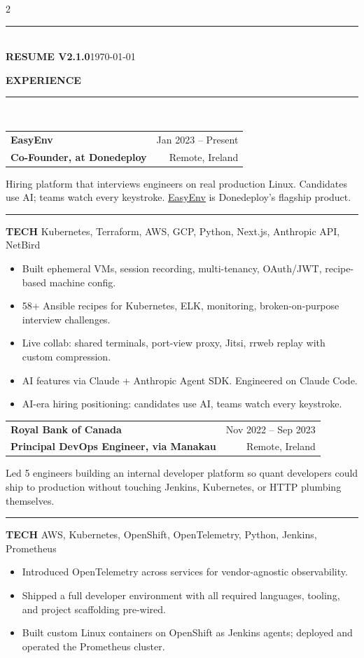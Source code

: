 \documentclass[10pt,letterpaper]{article}
\makeatletter
\newcommand{\so}[1]{#1}
\newcommand{\cvsection}[1]{%
  \vspace{8pt}%
  {\color{c1}\bfseries\fontsize{12}{14}\selectfont\so{\MakeUppercase{#1}}\hspace{6pt}{\color{c3}$\bullet$}}\\[2pt]%
  {\color{c2}\rule{\linewidth}{0.8pt}}\\[-12pt]%
}
\newcommand{\role}[4]{%
  \needspace{5\baselineskip}%
  \vspace{15pt}%
  \noindent\begin{tabular*}{\linewidth}{@{}l@{\extracolsep{\fill}}r@{}}
    {\color{accent}\bfseries\fontsize{12}{14}\selectfont #1} &
    {\color{muted}\fontsize{8.5}{10}\selectfont #4} \\[5pt]
    {\color{warm}\bfseries\fontsize{9.75}{11.5}\selectfont #2} &
    {\color{muted}\fontsize{8.5}{10}\selectfont #3} \\
  \end{tabular*}%
  \par\vspace{6pt}\nopagebreak%
}
\newcommand{\techline}[1]{%
  \par\vspace{3pt}\noindent%
  \textcolor{c3}{\rule[-1pt]{2pt}{10pt}}\hspace{6pt}%
  {\color{c2}\bfseries\fontsize{8}{10}\selectfont\so{TECH}}\hspace{6pt}%
  {\color{ink2}\fontsize{8.5}{10}\selectfont #1}%
  \par\vspace{6pt}%
}
\makeatother
\begin{document}
\begin{paracol}{2}
\vfill
\vspace{18pt}
{\color{rule}\rule{\linewidth}{0.3pt}}\\[3pt]
{\color{warm}\bfseries\fontsize{7.5}{9}\selectfont RESUME V2.1.0}\hfill{\color{mutedLight}\fontsize{7.5}{9}\selectfont\today}

\switchcolumn


\cvsection{Experience}
\fontsize{9.5}{11.5}\selectfont

\role{EasyEnv}{Co-Founder, at Donedeploy}{Remote, Ireland}{Jan 2023 -- Present}
Hiring platform that interviews engineers on real production Linux. Candidates use AI; teams watch every keystroke. \href{https://easyenv.io}{\color{c3}EasyEnv} is Donedeploy's flagship product.
\techline{Kubernetes, Terraform, AWS, GCP, Python, Next.js, Anthropic API, NetBird}
\begin{itemize}
  \item Built ephemeral VMs, session recording, multi-tenancy, OAuth/JWT, recipe-based machine config.
  \item 58+ Ansible recipes for Kubernetes, ELK, monitoring, broken-on-purpose interview challenges.
  \item Live collab: shared terminals, port-view proxy, Jitsi, rrweb replay with custom compression.
  \item AI features via Claude + Anthropic Agent SDK. Engineered on Claude Code.
  \item AI-era hiring positioning: candidates use AI, teams watch every keystroke.
\end{itemize}

\role{Royal Bank of Canada}{Principal DevOps Engineer, via Manakau}{Remote, Ireland}{Nov 2022 -- Sep 2023}
Led 5 engineers building an internal developer platform so quant developers could ship to production without touching Jenkins, Kubernetes, or HTTP plumbing themselves.
\techline{AWS, Kubernetes, OpenShift, OpenTelemetry, Python, Jenkins, Prometheus}
\begin{itemize}
  \item Introduced OpenTelemetry across services for vendor-agnostic observability.
  \item Shipped a full developer environment with all required languages, tooling, and project scaffolding pre-wired.
  \item Built custom Linux containers on OpenShift as Jenkins agents; deployed and operated the Prometheus cluster.
\end{itemize}


\end{paracol}
\end{document}
